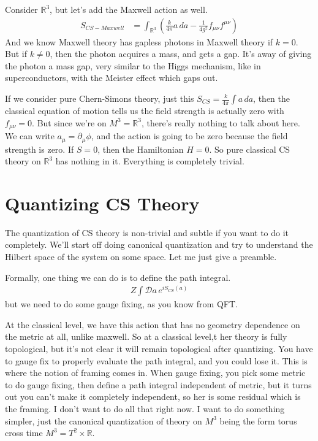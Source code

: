 Consider $\mathbb{R}^3$, but let's add the Maxwell action as well.
\begin{align}
    S_{CS-Maxwell}
    &=
    \int_{\mathbb{R}^3}
    \left( 
    \frac{k}{4\pi}
    a\, da
    -
    \frac{1}{4g^2}
    f_{\mu\nu} f^{\mu\nu}
    \right)
\end{align}
And we know Maxwell theory has gapless photons in Maxwell theory
if $k=0$.
But if $k\ne 0$,
then the photon acquires a mass,
and gets a gap.
It's away of giving the photon a mass gap,
very similar to the Higgs mechanism,
like in superconductors,
with the Meister effect which gaps out.


If we consider pure Chern-Simons theory,
just this $S_{CS} = \frac{k}{4\pi}\int a\, da$,
then the classical equation of motion tells us the field strength is actually
zero with $f_{\mu\nu} = 0$.
But since we're on $M^3 = \mathbb{R}^3$,
there's really nothing to talk about here.
We can write $a_\mu = \partial_\mu \phi$,
and the action is going to be zero because the field strength is zero.
If $S=0$, then the Hamiltonian $H=0$.
So pure classical CS theory on $\mathbb{R}^3$ has nothing in it.
Everything is completely trivial.

\section{Quantizing CS Theory}
The quantization of CS theory is non-trivial and subtle if you want to do it
completely.
We'll start off doing canonical quantization and try to understand the Hilbert
space of the system on some space.
Let me just give a preamble.

Formally,
one thing we can do is to define the path integral.
\begin{align}
    Z 
    \int \mathcal{D} a\,
    e^{i S_{CS}(a)}
\end{align}
but we need to do some gauge fixing,
as you know from QFT.

At the classical level,
we have this action that has no geometry dependence on the metric at all,
unlike maxwell.
So at a classical level,t
her theory is fully topological,
but it's not clear it will remain topological after quantizing.
You have to gauge fix to properly evaluate the path integral,
and you could lose it.
This is where the notion of framing comes in.
When gauge fixing,
you pick some metric to do gauge fixing,
then define a path integral independent of metric,
but it turns out you can't make it completely independent,
so her is some residual which is the framing.
I don't want to do all that right now.
I want to do something simpler,
just the canonical quantization of theory on $M^3$ being the form
torus cross time $M^3 = T^2 \times \mathbb{R}$.

